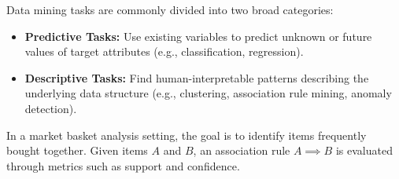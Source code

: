 Data mining tasks are commonly divided into two broad categories:
\begin{itemize}
    \item \textbf{Predictive Tasks:} Use existing variables to predict unknown or future values of target attributes (e.g., classification, regression).
    \item \textbf{Descriptive Tasks:} Find human-interpretable patterns describing the underlying data structure (e.g., clustering, association rule mining, anomaly detection).
\end{itemize}

\begin{example}
In a market basket analysis setting, the goal is to identify items frequently bought together. Given items $A$ and $B$, an association rule $A \implies B$ is evaluated through metrics such as support and confidence.
\end{example}
